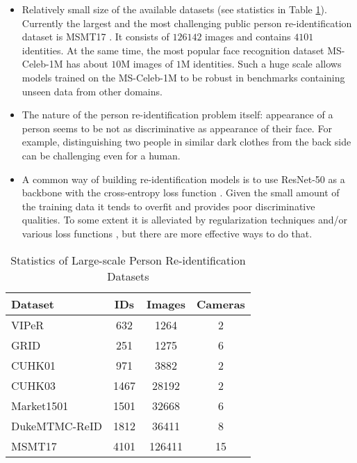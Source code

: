 \documentclass[a4paper,conference]{IEEEtran}
\begin{document}
\begin{itemize}
  \item Relatively small size of the available datasets (see statistics in Table
    \ref{tab:data}). Currently the largest and the most challenging public
    person re-identification dataset is MSMT17 \cite{MSMT17}. It consists of
    $126142$ images and contains $4101$ identities. At the same time, the most
    popular face recognition dataset MS-Celeb-1M \cite{ms1m} has about $10$M
    images of $1$M identities. Such a huge scale allows models trained on
    the MS-Celeb-1M to be robust in benchmarks containing unseen data
    \cite{deng2018arcface} from other domains.
  \item The nature of the person re-identification problem itself: appearance of
    a person seems to be not as discriminative as appearance of their face. For
    example, distinguishing two people in similar dark clothes from the back side
    can be challenging even for a human.
  \item A common way of building re-identification models is to use ResNet-50
    \cite{resnet} as a backbone with the cross-entropy loss function
    \cite{baselineCrossDomain, hpm}. Given the small amount of the training data
    it tends to overfit and provides poor discriminative qualities. To some
    extent it is alleviated by regularization techniques and/or various loss
    functions \cite{mgn, abd, lmSoftmax, centerLoss}, but there are more
    effective ways to do that.
\end{itemize}

\begin{table}
  \caption{Statistics of Large-scale Person Re-identification Datasets}
  \label{tab:data}
  \centering
  \begin{tabular}{l|c|c|c}
    Dataset & IDs & Images & Cameras \\ \hline
    VIPeR \cite{Gray2007EvaluatingAM} & 632 & 1264 & 2 \\
    GRID \cite{Loy2009MulticameraAC} & 251 & 1275 & 6 \\
    CUHK01 \cite{cuhk01} & 971 & 3882 & 2 \\
    CUHK03 \cite{firstCNNReid} & 1467 & 28192 & 2 \\
    \hline
    Market1501 \cite{market} & 1501 & 32668 & 6 \\
    DukeMTMC-ReID \cite{duke, duke2} & 1812 & 36411 & 8 \\
    MSMT17 \cite{MSMT17} & 4101 & 126411 & 15 \\
    \hline
  \end{tabular}
\end{table}
\end{document}
